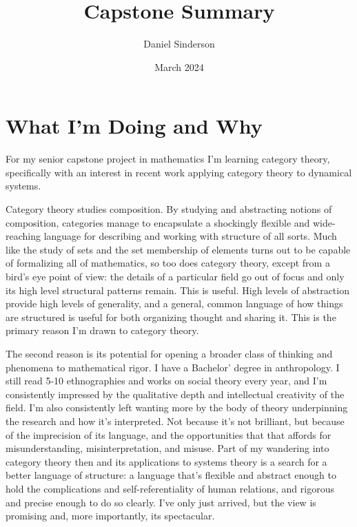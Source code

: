 \documentclass{article}
\title{Capstone Summary}
\author{Daniel Sinderson}
\date{March 2024}
\theoremstyle{definition}
\begin{document}
\maketitle

\section*{What I'm Doing and Why}
For my senior capstone project in mathematics I'm learning category theory,
specifically with an interest in recent work applying category theory to dynamical systems.

Category theory studies composition.
By studying and abstracting notions of composition, categories manage to encapsulate
a shockingly flexible and wide-reaching language for describing and working with structure of all sorts.
Much like the study of sets and the set membership of elements turns out to be capable of formalizing all of mathematics,
so too does category theory, except from a bird's eye point of view:
the details of a particular field go out of focus and only its high level structural patterns remain.
This is useful.
High levels of abstraction provide high levels of generality,
and a general, common language of how things are structured is useful for both organizing thought and sharing it.
This is the primary reason I'm drawn to category theory.

The second reason is its potential for opening a broader class of thinking and phenomena to mathematical rigor.
I have a Bachelor' degree in anthropology.
I still read 5-10 ethnographies and works on social theory every year,
and I'm consistently impressed by the qualitative depth and intellectual creativity of the field.
I'm also consistently left wanting more by the body of theory underpinning the research and how it's interpreted.
Not because it's not brilliant, but because of the imprecision of its language,
and the opportunities that that affords for misunderstanding, misinterpretation, and misuse.
Part of my wandering into category theory then and its applications to systems theory
is a search for a better language of structure: a language that's flexible and abstract enough
to hold the complications and self-referentiality of human relations, and rigorous and precise enough
to do so clearly.
I've only just arrived, but the view is promising and, more importantly, its spectacular.


\end{document}
